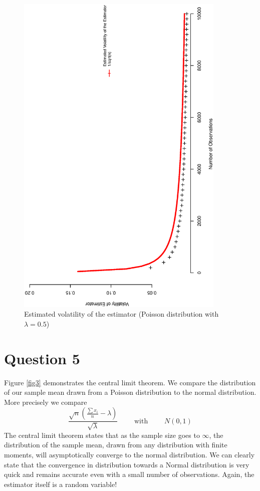 \begin{figure}[H]
\centering
\includegraphics[width=10cm, angle=270]{Q1_4plot.eps}
\caption{Estimated volatility of the estimator (Poisson distribution with $\lambda=0.5$)}
\label{fig2}
\end{figure}


\section{Question 5}

Figure \ref{fig3}  demonstrates the central limit theorem. We compare the distribution of our sample mean drawn from a Poisson distribution to the normal distribution. More precisely we compare
\begin{equation*}
\frac{\sqrt{n}(\frac{\sum{x_i}}{n}-\lambda)}{\sqrt{\lambda}} \qquad \textrm{ with } \qquad N(0,1)
\end{equation*}
The central limit theorem states that as the sample size goes to $\infty$, the distribution of the sample mean, drawn from any distribution with finite moments, will asymptotically converge to the normal distribution.  We can clearly state that the convergence in distribution towards a Normal distribution is very quick and remains accurate even with a small number of observations. Again, the estimator itself is a random variable!

